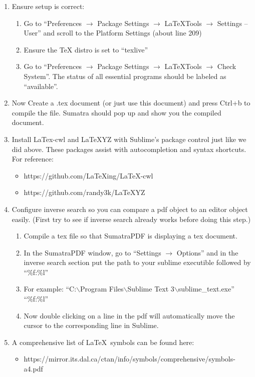 \documentclass{article}
\begin{document}
\begin{enumerate}
\item Ensure setup is correct:
	\begin{enumerate}
		\item Go to ``Preferences $\rightarrow$ Package Settings $\rightarrow$ LaTeXTools $\rightarrow$ Settings -- User'' and scroll to the Platform Settings (about line 209)
		\item Ensure the TeX distro is set to ``texlive''
		\item Go to ``Preferences $\rightarrow$ Package Settings $\rightarrow$ LaTeXTools $\rightarrow$ Check System''. The status of all essential programs should be labeled as ``available''.
	\end{enumerate}

\item Now Create a .tex document (or just use this document) and press Ctrl+b to compile the file. Sumatra should pop up and show you the compiled document.

\item Install LaTex-cwl and LaTeXYZ with Sublime's package control just like we did above. These packages assist with autocompletion and syntax shortcuts. For reference:
	\begin{itemize}
		\item https://github.com/LaTeXing/LaTeX-cwl
		\item https://github.com/randy3k/LaTeXYZ
	\end{itemize}

\item Configure inverse search so you can compare a pdf object to an editor object easily. (First try to see if inverse search already works before doing this step.)
	\begin{enumerate}
		\item Compile a tex file so that SumatraPDF is displaying a tex document.
		\item In the SumatraPDF window, go to ``Settings $\rightarrow$ Options'' and in the inverse search section put the path to your sublime executible followed by ``\%f:\%l''
		\item For example: ``C:$ \backslash $Program Files$ \backslash $Sublime Text 3$ \backslash $sublime\_text.exe'' ``\%f:\%l''
		\item Now double clicking on a line in the pdf will automatically move the cursor to the corresponding line in Sublime.
	\end{enumerate}

\item A comprehensive list of \LaTeX \ symbols can be found here:
	\begin{itemize}
		\item https://mirror.its.dal.ca/ctan/info/symbols/comprehensive/symbols-a4.pdf
	\end{itemize}
\end{enumerate}
\end{document}
